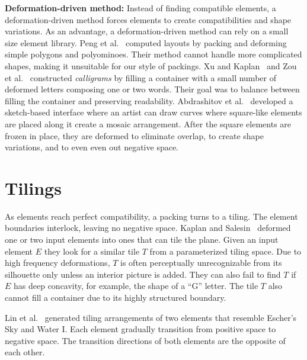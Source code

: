 \textbf{Deformation-driven method:}
Instead of finding compatible elements,
a deformation-driven method forces elements to create compatibilities
and shape variations.
As an advantage, a deformation-driven method can rely on a small size element library.
Peng et al.~\cite{Peng2014} computed layouts by packing and deforming
simple polygons and polyominoes. Their method cannot handle more
complicated shapes, making it unsuitable for our style of packings.
Xu and Kaplan~\cite{Xu2007} and Zou et al.~\cite{Zou2016}
constructed \textit{calligrams} by filling a container with a small
number of deformed letters composing one or two words.  
Their goal was to balance between filling the container and preserving
readability.
Abdrashitov et al.~\cite{Abdrashitov2014} developed
a sketch-based interface where an artist can draw curves where square-like elements are placed along it
create a mosaic arrangement.
After the square elements are frozen in place, 
they are deformed to eliminate overlap, to create shape variations, 
and to even even out negative space.  


\section{Tilings}
As elements reach perfect compatibility, a packing turns to a tiling.
The element boundaries interlock, leaving no negative space.
Kaplan and Salesin~\cite{Kaplan2000, Blah} deformed one or two 
input elements into ones that can tile the plane.
Given an input element $E$ they look for a similar tile $T$
from a parameterized tiling space.
Due to high frequency deformations,
$T$ is often perceptually unrecognizable from its silhouette only unless an interior picture is added.
They can also fail to find $T$ if $E$ has deep concavity, for example, the shape of a ``G'' letter.
The tile $T$  also cannot fill a container due to its highly structured boundary.

Lin et al.~\cite{Lin2018} generated tiling arrangements of two elements that resemble Escher's Sky and Water I.
Each element gradually transition from positive space to negative space. 
The transition directions of both elements are the opposite of each other.



